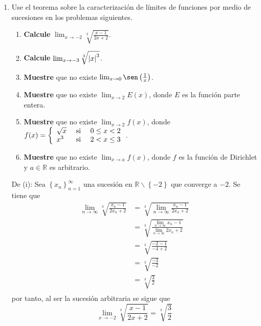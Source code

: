 \documentclass[12pt]{article}
\begin{document}
\begin{enumerate}
    \item Use el teorema sobre la caracterización de límites de funciones por medio de sucesiones en los problemas siguientes.
    \begin{enumerate}
        \item \textbf{Calcule} $\lim_{x\rightarrow-2}\sqrt[3]{\frac{x-1}{2x+2}}$.
        \item \textbf{Calcule} $\lim_{x\rightarrow-3}\sqrt[3]{\left| x \right|^3}$.
        \item \textbf{Muestre} que no existe $\lim_{x\rightarrow0}\sen\left(\frac{1}{x}\right)$.
        \item \textbf{Muestre} que no existe $\lim_{x\rightarrow2}E(x)$, donde $E$ es la función parte entera.
        \item \textbf{Muestre} que no existe $\lim_{x\rightarrow2}f(x)$, donde $f(x)=\left\{\begin{array}{lcr}
            \sqrt{x} & \textup{ si } & 0\leq x<2\\
            x^3 & \textup{ si } & 2<x\leq3 \\
        \end{array} \right.$.
        \item \textbf{Muestre} que no existe $\lim_{x\rightarrow a}f(x)$, donde $f$ es la función de Dirichlet y $a\in\mathbb{R}$ es arbitrario.
    \end{enumerate}

    \begin{sol}
        De (i): Sea $\left\{x_n\right\}_{ n=1}^\infty$ una sucesión en $\mathbb{R}\backslash\left\{-2\right\}$ que converge a $-2$. Se tiene que
        \begin{equation*}
            \begin{split}
                \lim_{ n\rightarrow\infty}\sqrt[3]{\frac{x_n-1}{2x_n+2}}&=\sqrt[3]{\lim_{ n\rightarrow\infty}\frac{x_n-1}{2x_n+2}}\\
                &=\sqrt[3]{\frac{\lim_{ n\rightarrow\infty}x_n-1}{\lim_{ n\rightarrow\infty}2x_n+2}}\\
                &=\sqrt[3]{\frac{-2-1}{-4+2}}\\
                &=\sqrt[3]{\frac{-3}{-2}}\\
                &=\sqrt[3]{\frac{3}{2}}\\
            \end{split}
        \end{equation*}
        por tanto, al ser la sucesión arbitraria se sigue que
        \begin{equation*}
            \lim_{ x\rightarrow-2}\sqrt[3]{\frac{x-1}{2x+2}}=\sqrt[3]{\frac{3}{2}}
        \end{equation*}


\end{sol}
\end{enumerate}
\end{document}
